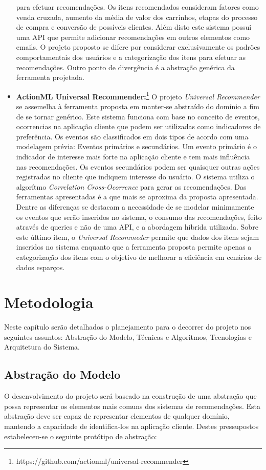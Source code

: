 \documentclass[
	12pt,				%
    oneside,			%
	a4paper,			%
	english,			%
	french,				%
	spanish,			%
	brazil,				%
	]{abntex2}
\begin{document}
\begin{itemize}
	para efetuar recomendações. Os itens recomendados consideram fatores como venda cruzada, aumento da média de valor dos carrinhos, etapas do processo de compra e conversão de possíveis clientes. Além disto 
	este sistema possui uma API que permite adicionar recomendações em outros elementos como emails. O projeto proposto se difere por considerar exclusivamente os padrões comportamentais dos usuários e a
	categorização dos itens para efetuar as recomendações. Outro ponto de divergência é a abstração genérica da ferramenta projetada. 
	\item \textbf{ActionML Universal Recommender:}\footnote{https://github.com/actionml/universal-recommender} O projeto \textit{Universal Recommender} se assemelha à ferramenta proposta em manter-se abstraído
	do domínio a fim de se tornar genérico. Este sistema funciona com base no conceito de eventos, ocorrencias na aplicação cliente que podem ser utilizadas como indicadores de preferência. Os eventos são
	classificados em dois tipos de acordo com uma modelagem prévia: Eventos primários e secundários. Um evento primário é o indicador de interesse mais forte na aplicação cliente e tem mais influência nas
	recomendações. Os eventos secundários podem ser quaisquer outras ações registradas no cliente que indiquem interesse do usuário. O sistema utiliza o algorítmo \textit{Correlation Cross-Ocorrence} para 
	gerar as recomendações. Das ferramentas apresentadas é a que mais se aproxima da proposta apresentada. Dentre as diferenças se destacam a necessidade de se modelar minimamente os eventos que serão inseridos
	no sistema, o consumo das recomendações, feito através de queries e não de uma API, e a abordagem híbrida utilizada. Sobre este último item, o \textit{Universal Recommeder} permite que dados dos itens sejam 
	inseridos no sistema enquanto que a ferramenta proposta permite apenas a categorização dos itens com o objetivo de melhorar a eficiência em cenários de dados esparços.
\end{itemize} 

\chapter{Metodologia}
Neste capítulo serão detalhados o planejamento para o decorrer do projeto nos seguintes assuntos: Abstração do Modelo, Técnicas e Algoritmos, Tecnologias e
Arquitetura do Sistema.

\section{Abstração do Modelo}
O desenvolvimento do projeto será baseado na construção de uma abstração que possa representar os elementos mais comuns dos sistemas de recomendações.
Esta abstração deve ser capaz de representar elementos de qualquer domínio, mantendo a capacidade de identifica-los na aplicação cliente. Destes pressupostos estabeleceu-se o seguinte protótipo de abstração:
\end{document}
